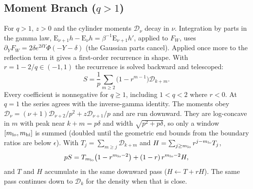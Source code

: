 \documentclass[12pt]{article}
\newcommand{\PhiN}{\Phi}
\begin{document}
\subsection{Moment Branch (\texorpdfstring{$q>1$}{q > 1})}
For $q>1$, $z>0$ and the cylinder moments $\mathcal D_\nu$ decay in $\nu$. Integration by parts in the gamma law, $\mathrm E_{\nu+1}h-\mathrm E_\nu h=\beta^{-1}\mathrm E_{\nu+1}h'$, applied to $F_W$, uses $\partial_YF_W=2\delta e^{2\delta Y}\PhiN(-Y-\delta)$ (the Gaussian parts cancel). Applied once more to the reflection term it gives a first-order recurrence in shape. With $r=1-2/q\in(-1,1)$ the recurrence is solved backward and telescoped:
\begin{equation}
  S=\frac1p\sum_{m\ge2}\bigl(1-r^{m-1}\bigr)\mathcal D_{k+m}.
  \label{eq:moment-S}
\end{equation}
Every coefficient is nonnegative for $q\ge1$, including $1<q<2$ where $r<0$. At $q=1$ the series agrees with the inverse-gamma identity. The moments obey $\mathcal D_\nu=(\nu+1)\mathcal D_{\nu+2}/p^2+z\mathcal D_{\nu+1}/p$ and are run downward. They are log-concave in $m$ with peak near $k+m=p\delta$ and width $\sqrt{p^2+p\delta}$, so only a window $[m_{\rm lo},m_{\rm hi}]$ is summed (doubled until the geometric end bounds from the boundary ratios are below $\epsilon$). With $T_j=\sum_{m\ge j}\mathcal D_{k+m}$ and $H=\sum_{j\ge m_{\rm lo}}r^{j-m_{\rm lo}}T_j$,
\begin{equation}
  pS=T_{m_{\rm lo}}\bigl(1-r^{m_{\rm lo}-2}\bigr)+(1-r)\,r^{m_{\rm lo}-2}H,
\end{equation}
and $T$ and $H$ accumulate in the same downward pass ($H\leftarrow T+rH$). The same pass continues down to $\mathcal D_k$ for the density when that is close.
\end{document}
